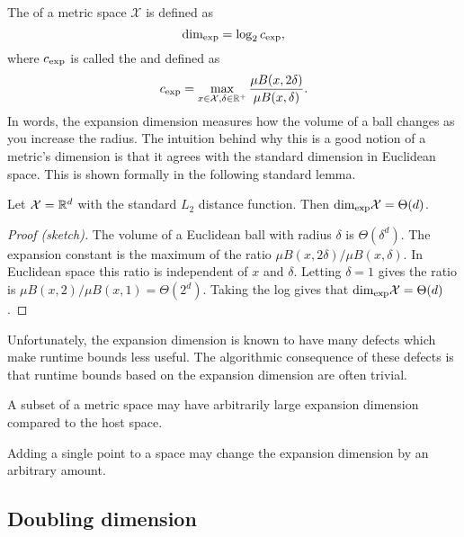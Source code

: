 \documentclass[thesis.tex]{subfiles}
\newcommand{\set}[1]{\mathcal {#1}}
\newcommand{\krdim}{\text{dim}_\textnormal{exp}}
\newcommand{\cexp}{c_\textnormal{exp}}
\begin{document}
The  of a metric space $\set X$ is defined as
\begin{equation}
    \krdim = \log_2 \cexp
    ,
\end{equation}
where $\cexp$ is called the  and defined as
\begin{equation}
    \cexp = \max_{x\in\set X, \delta\in\R^+} \frac{\mu B(x,2\delta)}{\mu B(x,\delta)}
    .
\end{equation}
In words, the expansion dimension measures how the volume of a ball changes as you increase the radius.
The intuition behind why this is a good notion of a metric's dimension is that it agrees with the standard dimension in Euclidean space.
This is shown formally in the following standard lemma.
\begin{lemma}
    \label{lemma:expansionEuclidean}
    Let $\set X=\R^d$ with the standard $L_2$ distance function.
    Then $\krdim\set X=\Theta(d)$.
\end{lemma}
\begin{proof}[Proof (sketch)]
    The volume of a Euclidean ball with radius $\delta$ is $\Theta(\delta^d)$.
    The expansion constant is the maximum of the ratio $\mu B(x,2\delta) / \mu B (x,\delta)$.
    In Euclidean space this ratio is independent of $x$ and $\delta$.
    Letting $\delta=1$ gives the ratio is $\mu B(x,2) / \mu B(x,1) = \Theta(2^d)$.
    Taking the log gives that $\krdim\set X = \Theta(d)$.
\end{proof}

\noindent
Unfortunately, the expansion dimension is known to have many defects which make runtime bounds less useful.
The algorithmic consequence of these defects is that runtime bounds based on the expansion dimension are often trivial.

\begin{example}
    A subset of a metric space may have arbitrarily large expansion dimension compared to the host space.
    \fixme{}
\end{example}

\begin{example}
    Adding a single point to a space may change the expansion dimension by an arbitrary amount.
    \fixme{}
\end{example}


\subsection{Doubling dimension}
\end{document}
